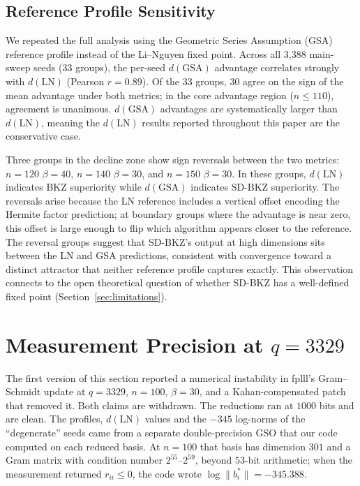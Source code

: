 \documentclass[journal=cic,version=preprint]{iacrj}
\begin{document}
\subsection{Reference Profile Sensitivity}
\label{sec:gsa}

We repeated the full analysis using the Geometric Series Assumption (GSA) reference profile instead of the Li--Nguyen fixed point. Across all 3{,}388 main-sweep seeds (33 groups), the per-seed $d(\mathrm{GSA})$ advantage correlates strongly with $d(\mathrm{LN})$ (Pearson $r=0.89$). Of the 33 groups, 30 agree on the sign of the mean advantage under both metrics; in the core advantage region ($n\leq 110$), agreement is unanimous. $d(\mathrm{GSA})$ advantages are systematically larger than $d(\mathrm{LN})$, meaning the $d(\mathrm{LN})$ results reported throughout this paper are the conservative case.

Three groups in the decline zone show sign reversals between the two metrics: $n=120$ $\beta=40$, $n=140$ $\beta=30$, and $n=150$ $\beta=30$. In these groups, $d(\mathrm{LN})$ indicates BKZ superiority while $d(\mathrm{GSA})$ indicates SD-BKZ superiority. The reversals arise because the LN reference includes a vertical offset encoding the Hermite factor prediction; at boundary groups where the advantage is near zero, this offset is large enough to flip which algorithm appears closer to the reference. The reversal groups suggest that SD-BKZ's output at high dimensions sits between the LN and GSA predictions, consistent with convergence toward a distinct attractor that neither reference profile captures exactly. This observation connects to the open theoretical question of whether SD-BKZ has a well-defined fixed point (Section~\ref{sec:limitations}).

\section{Measurement Precision at $q=3329$}
\label{sec:q3329}

The first version of this section reported a numerical instability in fplll's Gram--Schmidt update at $q=3329$, $n=100$, $\beta=30$, and a Kahan-compensated patch that removed it. Both claims are withdrawn. The reductions ran at $1000$ bits and are clean. The profiles, $d(\mathrm{LN})$ values and the $-345$ log-norms of the ``degenerate'' seeds came from a separate double-precision GSO that our code computed on each reduced basis. At $n=100$ that basis has dimension $301$ and a Gram matrix with condition number $2^{55}$--$2^{59}$, beyond $53$-bit arithmetic; when the measurement returned $r_{ii}\le0$, the code wrote $\log\|b^*_i\|=-345.388$.
\end{document}

